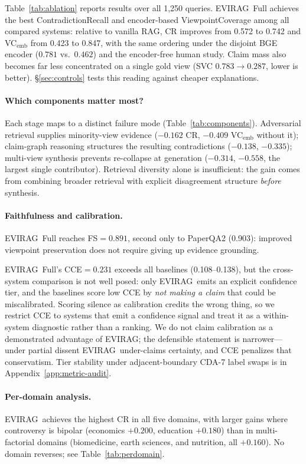 \documentclass[11pt]{article}
\newcommand{\system}{\textsc{EVIRAG}\xspace}
\begin{document}
Table~\ref{tab:ablation} reports results over all 1,250 queries.  \system\ Full
achieves the best ContradictionRecall and encoder-based ViewpointCoverage among
all compared systems: relative to vanilla RAG, CR improves from 0.572 to 0.742
and VC$_\text{emb}$ from 0.423 to 0.847, with the same ordering under the
disjoint BGE encoder ($0.781$ vs.\ $0.462$) and the encoder-free human study.
Claim mass also becomes far less concentrated on a single gold view
(SVC $0.783\to0.287$, lower is better).  \S\ref{sec:controls} tests this
reading against cheaper explanations.

\paragraph{Which components matter most?}
Each stage maps to a distinct failure mode (Table~\ref{tab:components}).
Adversarial retrieval supplies minority-view evidence ($-0.162$ CR, $-0.409$
VC$_\text{emb}$ without it); claim-graph reasoning structures the resulting
contradictions ($-0.138$, $-0.335$); multi-view synthesis prevents re-collapse
at generation ($-0.314$, $-0.558$, the largest single contributor).  Retrieval
diversity alone is insufficient: the gain comes from combining broader
retrieval with explicit disagreement structure \emph{before} synthesis.

\paragraph{Faithfulness and calibration.}
\label{sec:calib}
\system\ Full reaches FS$=0.891$, second only to PaperQA2 (0.903): improved
viewpoint preservation does not require giving up evidence grounding.

\system\ Full's CCE$=0.231$ exceeds all baselines (0.108--0.138), but the
cross-system comparison is not well posed: only \system\ emits an explicit
confidence tier, and the baselines score low CCE by \emph{not making a claim}
that could be miscalibrated.  Scoring silence as calibration credits the wrong
thing, so we restrict CCE to systems that emit a confidence signal and treat it
as a within-system diagnostic rather than a ranking.  We do not claim
calibration as a demonstrated advantage of \system; the defensible statement is
narrower---under partial dissent \system\ under-claims certainty, and CCE
penalizes that conservatism.  Tier stability under adjacent-boundary CDA-7
label swaps is in Appendix~\ref{app:metric-audit}.

\paragraph{Per-domain analysis.}
\system\ achieves the highest CR in all five domains, with larger gains where
controversy is bipolar (economics $+0.200$, education $+0.180$) than in
multi-factorial domains (biomedicine, earth sciences, and nutrition, all
$+0.160$).  No domain reverses; see Table~\ref{tab:perdomain}.
\end{document}
